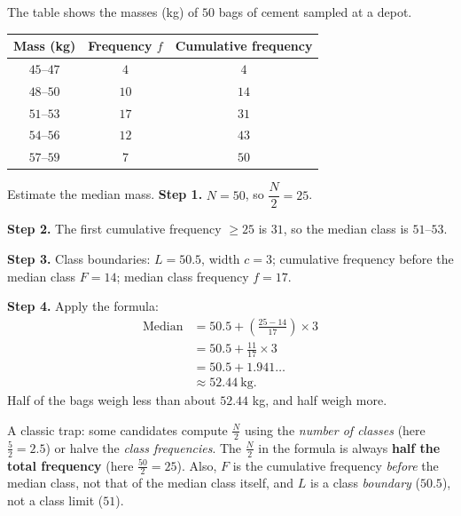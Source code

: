 \documentclass[11pt]{article}
\begin{document}
\begin{exoresolu}
The table shows the masses (kg) of $50$ bags of cement sampled at a depot.
\begin{center}
\begin{tabular}{|c|c|c|}
\hline
\rowcolor{popblueL} Mass (kg) & Frequency $f$ & Cumulative frequency \\
\hline
$45$--$47$ & $4$ & $4$ \\
\hline
$48$--$50$ & $10$ & $14$ \\
\hline
$51$--$53$ & $17$ & $31$ \\
\hline
$54$--$56$ & $12$ & $43$ \\
\hline
$57$--$59$ & $7$ & $50$ \\
\hline
\end{tabular}
\end{center}
Estimate the median mass.
\tcblower
\textbf{Step 1.} $N = 50$, so $\dfrac{N}{2} = 25$.

\textbf{Step 2.} The first cumulative frequency $\geq 25$ is $31$, so the median class is $51$--$53$.

\textbf{Step 3.} Class boundaries: $L = 50.5$, width $c = 3$; cumulative frequency before the median class $F = 14$; median class frequency $f = 17$.

\textbf{Step 4.} Apply the formula:
\begin{align*}
\text{Median} &= 50.5 + \left( \frac{25 - 14}{17} \right) \times 3 \\
&= 50.5 + \frac{11}{17} \times 3 \\
&= 50.5 + 1.941\ldots \\
&\approx 52.44\ \mathrm{kg}.
\end{align*}
Half of the bags weigh less than about $52.44$ kg, and half weigh more.
\end{exoresolu}

\begin{attention}
A classic trap: some candidates compute $\frac{N}{2}$ using the \emph{number of classes} (here $\frac{5}{2} = 2.5$) or halve the \emph{class frequencies}. The $\frac{N}{2}$ in the formula is always \textbf{half the total frequency} (here $\frac{50}{2} = 25$). Also, $F$ is the cumulative frequency \emph{before} the median class, not that of the median class itself, and $L$ is a class \emph{boundary} ($50.5$), not a class limit ($51$).
\end{attention}
\end{document}
